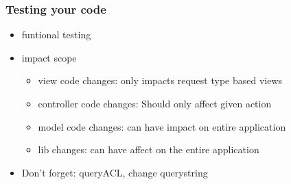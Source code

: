 \begin{frame}
  \frametitle{Testing your code}
  \begin{itemize}
    \item funtional testing
    \item impact scope
    \begin{itemize}
      \item view code changes: only impacts request type based views
      \item controller code changes: Should only affect given action
      \item model code changes: can have impact on entire application
      \item lib changes: can have affect on the entire application
    \end{itemize}
    \item Don't forget: queryACL, change querystring
  \end{itemize}
\end{frame}


